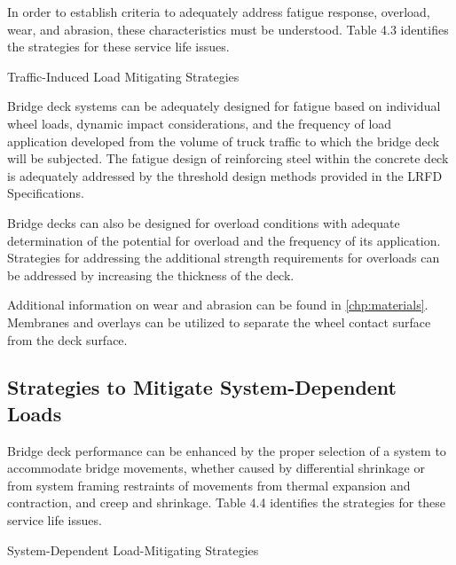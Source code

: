 In order to establish criteria to adequately address fatigue response, overload, wear, and abrasion, these
characteristics must be understood. Table 4.3 identifies the strategies for these service life issues.

\begin{table}
  \caption{Traffic-Induced Load Mitigating Strategies}
  \label{tab:traffic-induced-strategy}
\end{table}

Bridge deck systems can be adequately designed for fatigue based on individual wheel loads, dynamic impact
considerations, and the frequency of load application developed from the volume of truck traffic to which the bridge
deck will be subjected. The fatigue design of reinforcing steel within the concrete deck is adequately addressed by
the threshold design methods provided in the LRFD Specifications.

Bridge decks can also be designed for overload conditions with adequate determination of the potential for
overload and the frequency of its application. Strategies for addressing the additional strength requirements for
overloads can be addressed by increasing the thickness of the deck.

Additional information on wear and abrasion can be found in \cref{chp:materials}. Membranes and overlays can be utilized
to separate the wheel contact surface from the deck surface.

\subsection{Strategies to Mitigate System-Dependent Loads}
\label{subsec:strategies-mitigate-system-dependent}

Bridge deck performance can be enhanced by the proper selection of a system to accommodate bridge
movements, whether caused by differential shrinkage or from system framing restraints of movements from thermal
expansion and contraction, and creep and shrinkage. Table 4.4 identifies the strategies for these service life issues.


\begin{table}
  \caption{System-Dependent Load-Mitigating Strategies}
  \label{tab:system-dependent-strategy}
\end{table}

